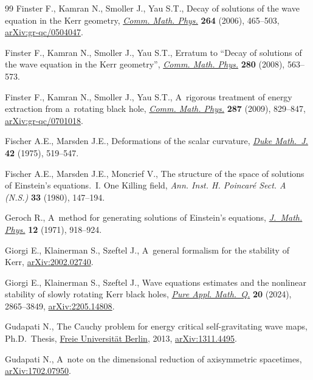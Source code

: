 \documentclass[pdftex]{sigma}
\numberwithin{equation}{section}
\begin{document}
\begin{thebibliography}{99}
Finster F., Kamran N., Smoller J., Yau S.T., Decay of solutions of the wave
 equation in the {K}err geometry,
 \href{https://doi.org/10.1007/s00220-006-1525-8}{\textit{Comm. Math. Phys.}}
 \textbf{264} (2006), 465--503,
 \href{http://arxiv.org/abs/gr-qc/0504047}{arXiv:gr-qc/0504047}.

Finster F., Kamran N., Smoller J., Yau S.T., Erratum to ``{D}ecay of solutions
 of the wave equation in the {K}err geometry'',
 \href{https://doi.org/10.1007/s00220-008-0458-9}{\textit{Comm. Math. Phys.}}
 \textbf{280} (2008), 563--573.

Finster F., Kamran N., Smoller J., Yau S.T., A~rigorous treatment of energy
 extraction from a~rotating black hole,
 \href{https://doi.org/10.1007/s00220-009-0730-7}{\textit{Comm. Math. Phys.}}
 \textbf{287} (2009), 829--847,
 \href{http://arxiv.org/abs/gr-qc/0701018}{arXiv:gr-qc/0701018}.

Fischer A.E., Marsden J.E., Deformations of the scalar curvature,
 \href{https://doi.org/10.1215/S0012-7094-75-04249-0}{\textit{Duke Math.~J.}}
 \textbf{42} (1975), 519--547.

Fischer A.E., Marsden J.E., Moncrief V., The structure of the space of
 solutions of {E}instein's equations.~{I}. {O}ne {K}illing field, \textit{Ann.
 Inst. H. Poincar\'e Sect. A (N.S.)} \textbf{33} (1980), 147--194.

Geroch R., A~method for generating solutions of {E}instein's equations,
 \href{https://doi.org/10.1063/1.1665681}{\textit{J.~Math. Phys.}} \textbf{12}
 (1971), 918--924.

Giorgi E., Klainerman S., Szeftel J., A~general formalism for the stability of
 {K}err, \href{http://arxiv.org/abs/2002.02740}{arXiv:2002.02740}.

Giorgi E., Klainerman S., Szeftel J., Wave equations estimates and the
 nonlinear stability of slowly rotating {K}err black holes,
 \href{https://doi.org/10.4310/pamq.241128023033}{\textit{Pure Appl.
 Math.~Q.}} \textbf{20} (2024), 2865--3849,
 \href{http://arxiv.org/abs/2205.14808}{arXiv:2205.14808}.

Gudapati N., The {C}auchy problem for energy critical self-gravitating wave maps, Ph.D.~Thesis, \href{http://doi.org/10.17169/refubium-6002}{{F}reie Universit\"at Berlin}, 2013, \href{http://arxiv.org/abs/1311.4495}{arXiv:1311.4495}.

Gudapati N., A~note on the dimensional reduction of axisymmetric spacetimes,
 \href{http://arxiv.org/abs/1702.07950}{arXiv:1702.07950}.


\end{thebibliography}
\end{document}
